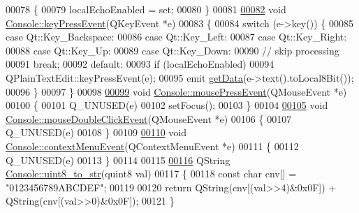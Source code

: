\begin{DoxyCode}
00078 \{
00079     localEchoEnabled = set;
00080 \}
00081 
\hypertarget{a00032_source_l00082}{}\hyperlink{a00002_a558b58e3e68a167a7897a77bee78536c}{00082} \textcolor{keywordtype}{void} \hyperlink{a00002_a558b58e3e68a167a7897a77bee78536c}{Console::keyPressEvent}(QKeyEvent *e)
00083 \{
00084     \textcolor{keywordflow}{switch} (e->key()) \{
00085     \textcolor{keywordflow}{case} Qt::Key\_Backspace:
00086     \textcolor{keywordflow}{case} Qt::Key\_Left:
00087     \textcolor{keywordflow}{case} Qt::Key\_Right:
00088     \textcolor{keywordflow}{case} Qt::Key\_Up:
00089     \textcolor{keywordflow}{case} Qt::Key\_Down:
00090         \textcolor{comment}{// skip processing}
00091         \textcolor{keywordflow}{break};
00092     \textcolor{keywordflow}{default}:
00093         \textcolor{keywordflow}{if} (localEchoEnabled)
00094             QPlainTextEdit::keyPressEvent(e);
00095         emit \hyperlink{a00002_a1976aad46ce1a77be730bc628275038f}{getData}(e->text().toLocal8Bit());
00096     \}
00097 \}
00098 
\hypertarget{a00032_source_l00099}{}\hyperlink{a00002_a615736fd63c7fc70536e2b775b0ce745}{00099} \textcolor{keywordtype}{void} \hyperlink{a00002_a615736fd63c7fc70536e2b775b0ce745}{Console::mousePressEvent}(QMouseEvent *e)
00100 \{
00101     Q\_UNUSED(e)
00102     setFocus();
00103 \}
00104 
\hypertarget{a00032_source_l00105}{}\hyperlink{a00002_a1727cadc147a07ed86fd4cb91908fd5f}{00105} \textcolor{keywordtype}{void} \hyperlink{a00002_a1727cadc147a07ed86fd4cb91908fd5f}{Console::mouseDoubleClickEvent}(QMouseEvent *e)
00106 \{
00107     Q\_UNUSED(e)
00108 \}
00109 
\hypertarget{a00032_source_l00110}{}\hyperlink{a00002_a199dade448d3ae597d420dc65abca11c}{00110} \textcolor{keywordtype}{void} \hyperlink{a00002_a199dade448d3ae597d420dc65abca11c}{Console::contextMenuEvent}(QContextMenuEvent *e)
00111 \{
00112     Q\_UNUSED(e)
00113 \}
00114 
00115 
\hypertarget{a00032_source_l00116}{}\hyperlink{a00002_a9194022b884875614a4f7056454881c1}{00116} QString \hyperlink{a00002_a9194022b884875614a4f7056454881c1}{Console::uint8\_to\_str}(quint8 val)
00117 \{
00118     \textcolor{keyword}{const} \textcolor{keywordtype}{char} cnv[] = \textcolor{stringliteral}{"0123456789ABCDEF"};
00119 
00120     \textcolor{keywordflow}{return} QString(cnv[(val>>4)&0x0F]) + QString(cnv[(val>>0)&0x0F]);
00121 \}
\end{DoxyCode}
